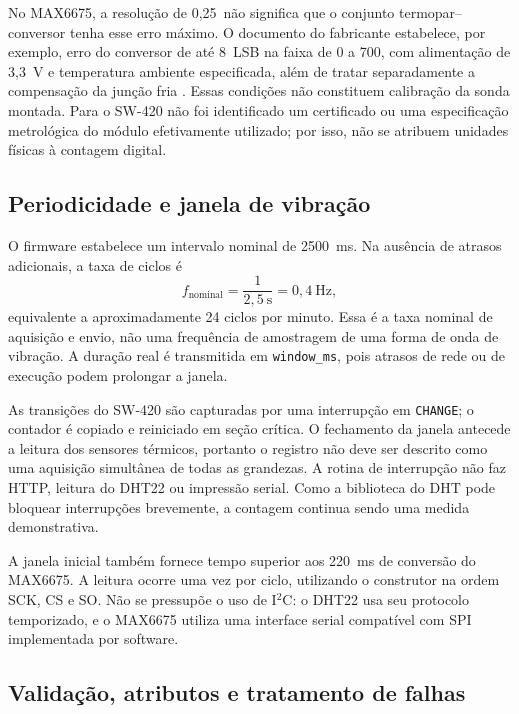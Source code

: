 No MAX6675, a resolução de 0,25\celsius\ não significa que o conjunto
termopar--conversor tenha esse erro máximo. O documento do fabricante
estabelece, por exemplo, erro do conversor de até 8~LSB na faixa de 0 a
700\celsius, com alimentação de 3,3~V e temperatura ambiente especificada,
além de tratar separadamente a compensação da junção fria
\cite{max6675}. Essas condições não constituem calibração da sonda montada.
Para o SW-420 não foi identificado um certificado ou uma especificação
metrológica do módulo efetivamente utilizado; por isso, não se atribuem
unidades físicas à contagem digital.

\subsection{Periodicidade e janela de vibração}

O firmware estabelece um intervalo nominal de 2500~ms. Na ausência de
atrasos adicionais, a taxa de ciclos é
\begin{equation}
f_{\mathrm{nominal}}=\frac{1}{2{,}5~\mathrm{s}}
=0{,}4~\mathrm{Hz},
\end{equation}
equivalente a aproximadamente 24 ciclos por minuto. Essa é a taxa nominal
de aquisição e envio, não uma frequência de amostragem de uma forma de
onda de vibração. A duração real é transmitida em \texttt{window\_ms},
pois atrasos de rede ou de execução podem prolongar a janela.

As transições do SW-420 são capturadas por uma interrupção em
\texttt{CHANGE}; o contador é copiado e reiniciado em seção crítica.
O fechamento da janela antecede a leitura dos sensores térmicos, portanto
o registro não deve ser descrito como uma aquisição simultânea de todas
as grandezas. A rotina de interrupção não faz HTTP, leitura do DHT22 ou
impressão serial. Como a biblioteca do DHT pode bloquear interrupções
brevemente, a contagem continua sendo uma medida demonstrativa.

A janela inicial também fornece tempo superior aos 220~ms de conversão
do MAX6675. A leitura ocorre uma vez por ciclo, utilizando o construtor
na ordem SCK, CS e SO. Não se pressupõe o uso de I$^{2}$C: o DHT22 usa
seu protocolo temporizado, e o MAX6675 utiliza uma interface serial
compatível com SPI implementada por software.

\subsection{Validação, atributos e tratamento de falhas}

